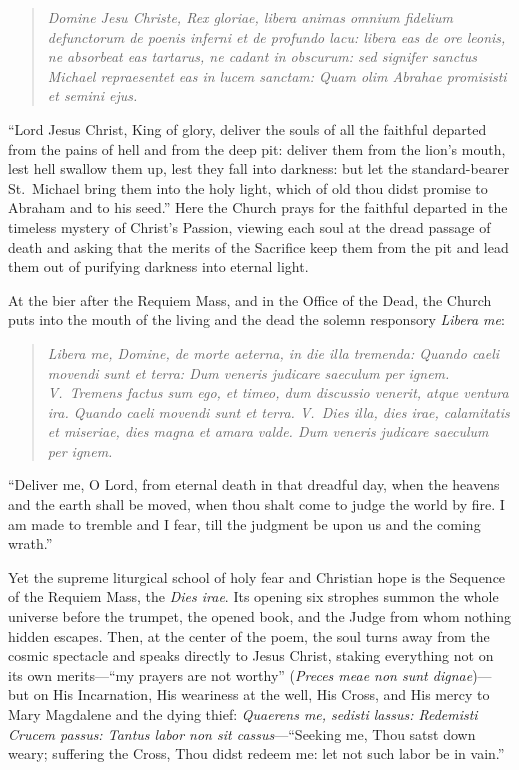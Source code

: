\begin{quote}
\textit{Domine Jesu Christe, Rex gloriae, libera animas omnium fidelium defunctorum de poenis inferni et de profundo lacu: libera eas de ore leonis, ne absorbeat eas tartarus, ne cadant in obscurum: sed signifer sanctus Michael repraesentet eas in lucem sanctam: Quam olim Abrahae promisisti et semini ejus.}
\end{quote}

``Lord Jesus Christ, King of glory, deliver the souls of all the faithful departed from the pains of hell and from the deep pit: deliver them from the lion's mouth, lest hell swallow them up, lest they fall into darkness: but let the standard-bearer St.\ Michael bring them into the holy light, which of old thou didst promise to Abraham and to his seed.'' Here the Church prays for the faithful departed in the timeless mystery of Christ's Passion, viewing each soul at the dread passage of death and asking that the merits of the Sacrifice keep them from the pit and lead them out of purifying darkness into eternal light.

At the bier after the Requiem Mass, and in the Office of the Dead, the Church puts into the mouth of the living and the dead the solemn responsory \textit{Libera me}:

\begin{quote}
\textit{Libera me, Domine, de morte aeterna, in die illa tremenda: Quando caeli movendi sunt et terra: Dum veneris judicare saeculum per ignem. V.\ Tremens factus sum ego, et timeo, dum discussio venerit, atque ventura ira. Quando caeli movendi sunt et terra. V.\ Dies illa, dies irae, calamitatis et miseriae, dies magna et amara valde. Dum veneris judicare saeculum per ignem.}
\end{quote}

``Deliver me, O Lord, from eternal death in that dreadful day, when the heavens and the earth shall be moved, when thou shalt come to judge the world by fire. I am made to tremble and I fear, till the judgment be upon us and the coming wrath.''

Yet the supreme liturgical school of holy fear and Christian hope is the Sequence of the Requiem Mass, the \textit{Dies irae}. Its opening six strophes summon the whole universe before the trumpet, the opened book, and the Judge from whom nothing hidden escapes. Then, at the center of the poem, the soul turns away from the cosmic spectacle and speaks directly to Jesus Christ, staking everything not on its own merits---``my prayers are not worthy'' (\textit{Preces meae non sunt dignae})---but on His Incarnation, His weariness at the well, His Cross, and His mercy to Mary Magdalene and the dying thief: \textit{Quaerens me, sedisti lassus: Redemisti Crucem passus: Tantus labor non sit cassus}---``Seeking me, Thou satst down weary; suffering the Cross, Thou didst redeem me: let not such labor be in vain.''

